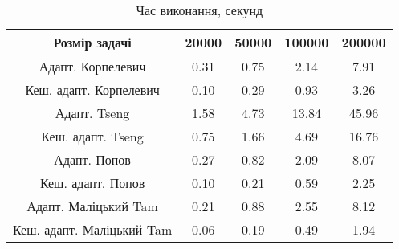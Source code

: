 \begin{table}[H]
	\centering
	\begin{tabular}{|c||c|c|c|c|}\hline
		Розмір задачі & 20000 & 50000 & 100000 & 200000 \\ \hline \hline
		Адапт. Корпелевич & 0.31 & 0.75 & 2.14 & 7.91 \\ \hline
		Кеш. адапт. Корпелевич & 0.10 & 0.29 & 0.93 & 3.26 \\ \hline
		Адапт. Tseng & 1.58 & 4.73 & 13.84 & 45.96 \\ \hline
		Кеш. адапт. Tseng & 0.75 & 1.66 & 4.69 & 16.76 \\ \hline
		Адапт. Попов & 0.27 & 0.82 & 2.09 & 8.07 \\ \hline
		Кеш. адапт. Попов & 0.10 & 0.21 & 0.59 & 2.25 \\ \hline
		Адапт. Маліцький Tam & 0.21 & 0.88 & 2.55 & 8.12 \\ \hline
		Кеш. адапт. Маліцький Tam & 0.06 & 0.19 & 0.49 & 1.94 \\ \hline
	\end{tabular}
	\caption{Час виконання, секунд}
\end{table}
